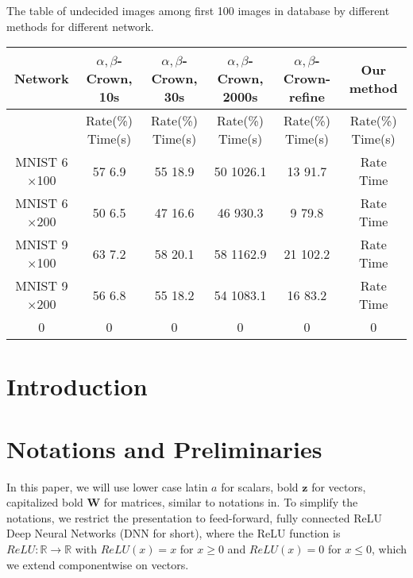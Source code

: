 \documentclass{article} %
\theoremstyle{definition}
\begin{document}
\vspace*{4ex}

The table of undecided images among first 100 images in database by different methods for different network.

\begin{tabular}{|c|c|c|c|c|c|}
	\hline
	Network & $\alpha,\beta$-Crown, 10s & $\alpha,\beta$-Crown, 30s & $\alpha,\beta$-Crown, 2000s & $\alpha,\beta$-Crown-refine & Our method \\ \hline
	& Rate(\%) \hfill Time(s) & Rate(\%) \hfill Time(s) & Rate(\%) \hfill Time(s) & Rate(\%) \hfill Time(s) & Rate(\%) \hfill Time(s)\\ \hline
	MNIST 6$\times$100 & 57 \hfill 6.9 & 55 \hfill 18.9 & 50 \hfill 1026.1 & 13 \hfill 91.7 & Rate \hfill Time \\ \hline
	MNIST 6$\times$200 & 50 \hfill 6.5 & 47 \hfill 16.6 & 46 \hfill 930.3 & 9 \hfill 79.8 & Rate \hfill Time \\ \hline
	MNIST 9$\times$100 & 63 \hfill 7.2 & 58 \hfill 20.1 & 58 \hfill 1162.9 & 21 \hfill 102.2 & Rate \hfill Time \\ \hline
	MNIST 9$\times$200 & 56 \hfill 6.8 & 55 \hfill 18.2 & 54 \hfill 1083.1 & 16 \hfill 83.2 & Rate \hfill Time \\ \hline
	0 & 0 & 0 & 0 & 0 & 0 \\ \hline
\end{tabular}


	\section{Introduction}


%


\section{Notations and Preliminaries}

In this paper, we will use lower case latin $a$ for scalars, bold $\boldsymbol{z}$ for vectors, 
capitalized bold $\boldsymbol{W}$ for matrices, similar to notations in.
To simplify the notations, we restrict the presentation to feed-forward, 
fully connected ReLU Deep Neural Networks (DNN for short), where the ReLU function is $ReLU : \mathbb{R} \rightarrow \mathbb{R}$ with
$ReLU(x)=x$ for $x \geq 0$ and $ReLU(x)=0$ for $x \leq 0$, which we extend componentwise on vectors.

\end{document}
